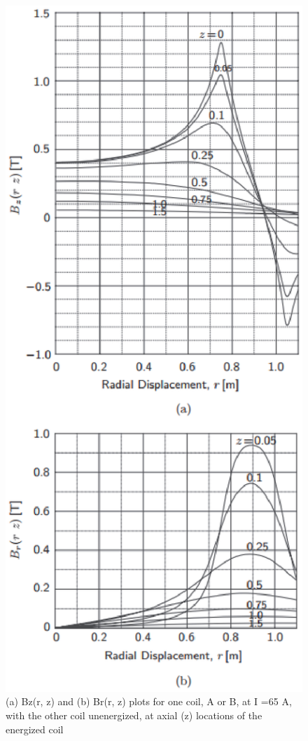 \begin{figure}[htbp]
	\centering
	\includegraphics[scale=0.5]{chpt3/figs/fig3.42.eps}
	\caption{(a) Bz(r, z) and (b) Br(r, z) plots for one coil, A or B, at I =65 A,
		with the other coil unenergized, at axial (z) locations of the energized coil}
\end{figure}

